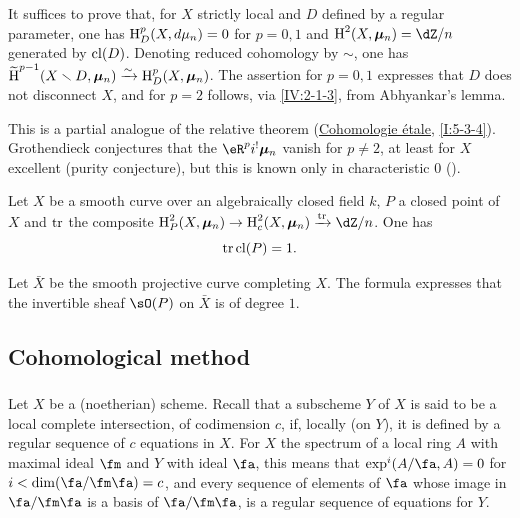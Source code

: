 It suffices to prove that, for $X$ strictly local and $D$ defined by a
regular parameter, one has $\operatorname{H}_D^p(X,d\mu_n) = 0$ for $p=0,1$ and
$\h^2(X,\dmu_n) = \dZ/n$ generated by $\operatorname{cl}(D)$. Denoting
reduced cohomology by $\sim$, one has
$\widetilde{\operatorname{H}}^{p-1}(X\smallsetminus D,{\bm\mu}_n)\xrightarrow\sim \operatorname{H}_D^p(X,{\bm\mu}_n)$. The assertion
for $p=0,1$ expresses that $D$ does not disconnect $X$, and for $p=2$ follows,
via \ref{IV:2-1-3}, from Abhyankar's lemma.

This is a partial analogue of the relative theorem
(\hyperref[I]{Cohomologie \'etale}, \ref{I:5-3-4}). Grothendieck conjectures
that the $\eR^p i^! \dmu_n$ vanish for $p\ne 2$, at least for $X$ excellent
(purity conjecture), but this is known only in characteristic $0$
(\cite[XIX]{sga4}).




\begin{theorem}\label{IV:2-1-5}
Let $X$ be a smooth curve over an algebraically closed field $k$, $P$ a
closed point of $X$ and $\operatorname{tr}$ the composite $\h_P^2(X,\dmu_n) \to \h_c^2(X,\dmu_n) \xrightarrow{\tr} \dZ/n$. One has
\[
  \operatorname{tr} \operatorname{cl}(P) = 1 \text{.}
\]
\end{theorem}

Let $\bar X$ be the smooth projective curve completing $X$. The formula
expresses that the invertible sheaf $\sO(P)$ on $\bar X$ is of degree $1$.










\subsection{Cohomological method}\label{IV:2-2}




\subsubsection{}\label{IV:2-2-1}

Let $X$ be a (noetherian) scheme. Recall that a subscheme $Y$ of $X$
is said to be a local complete intersection, of codimension $c$, if, locally
(on $Y$), it is defined by a regular sequence of $c$ equations in
$X$. For $X$ the spectrum of a local ring $A$ with maximal ideal $\fm$ and
$Y$ with ideal $\fa$, this means that $\exp^i(A/\fa,A) = 0$ for
$i<\dim(\fa/\fm\fa)=c$, and every sequence of elements of $\fa$ whose image in
$\fa/\fm\fa$ is a basis of $\fa/\fm\fa$, is a regular sequence
of equations for $Y$.




